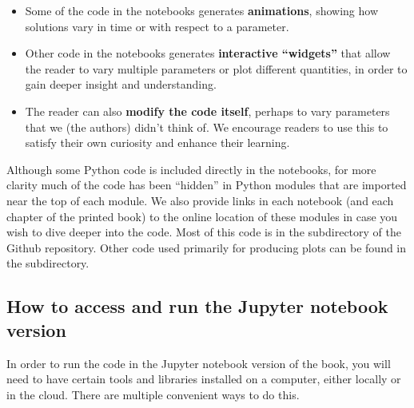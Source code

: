 \documentclass{SIAMbook2016}
\providecommand{\tightlist}{%
      \setlength{\itemsep}{0pt}\setlength{\parskip}{0pt}}
\begin{document}
\begin{itemize}
\tightlist
\item
  Some of the code in the notebooks generates \textbf{animations},
  showing how solutions vary in time or with respect to a parameter.
\item
  Other code in the notebooks generates \textbf{interactive ``widgets''}
  that allow the reader to vary multiple parameters or plot different
  quantities, in order to gain deeper insight and understanding.
\item
  The reader can also \textbf{modify the code itself}, perhaps to vary
  parameters that we (the authors) didn't think of. We encourage readers
  to use this to satisfy their own curiosity and enhance their learning.
\end{itemize}

Although some Python code is included directly in the notebooks, for
more clarity much of the code has been ``hidden'' in Python modules that
are imported near the top of each module. We also provide links in each
notebook (and each chapter of the printed book) to the online location
of these modules in case you wish to dive deeper into the code. Most of
this code is in the
subdirectory of the Github repository. Other code used primarily for
producing plots can be found in the
subdirectory.

\hypertarget{how-to-access-and-run-the-jupyter-notebook-version}{%
\subsection*{How to access and run the Jupyter notebook
version}\label{how-to-access-and-run-the-jupyter-notebook-version}}

In order to run the code in the Jupyter notebook version of the book,
you will need to have certain tools and libraries installed on a
computer, either locally or in the cloud. There are multiple convenient
ways to do this.
\end{document}
